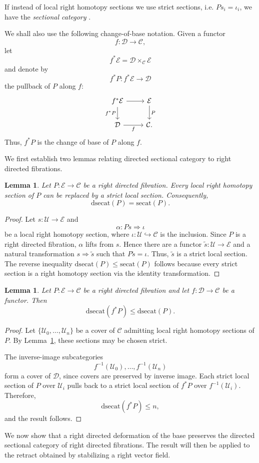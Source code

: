\documentclass[12pt]{amsart}
\newtheorem{lemma}[teo]{Lemma}
\theoremstyle{definition}
\theoremstyle{remark}
\numberwithin{figure}{section}%
\newcommand{\CC}{\mathcal{C}}
\newcommand{\Dc}{\mathcal{D}}
\newcommand{\E}{\mathcal{E}}
\newcommand{\Uc}{\mathcal{U}}
\begin{document}
If instead of local right homotopy sections we use strict sections, i.e. \(P s_i=\iota_i\), we have the \emph{sectional category} \cite{Baues-Isaac}.

We shall also use the following change-of-base notation. Given a functor
\[
f\colon\Dc\longrightarrow\CC,
\]
let
\[
f^*\E=\Dc\times_\CC\E
\]
and denote by
\[
f^*P\colon f^*\E\longrightarrow\Dc
\]
the pullback of \(P\) along \(f\):
\[
\begin{tikzcd}
f^*\E
  \arrow[r]
  \arrow[d, "f^*P"']
&
\E
  \arrow[d, "P"]
\\
\Dc
  \arrow[r, "f"']
&
\CC .
\end{tikzcd}
\]
Thus, \(f^*P\) is the change of base of \(P\) along \(f\).

We first establish two lemmas relating directed sectional category to right directed fibrations.

\begin{lemma}\label{lem:right_fibration_strictification}
Let \(P\colon\E\to\CC\) be a right directed fibration. Every local right
homotopy section of \(P\) can be replaced by a strict local section.
Consequently,
\[
\mathrm{dsecat}(P)=\mathrm{secat}(P).
\]
\end{lemma}

\begin{proof}
Let \(s\colon\Uc\to\E\) and
\[
\alpha\colon Ps\Rightarrow\iota
\]
be a local right homotopy section, where
\(\iota\colon\Uc\hookrightarrow\CC\) is the inclusion. Since \(P\) is a
right directed fibration, \(\alpha\) lifts from \(s\). Hence there are a
functor \(\widetilde s\colon\Uc\to\E\) and a natural transformation
\(
s\Rightarrow\widetilde s
\)
such that
\(
P\widetilde s=\iota.
\)
Thus, \(\widetilde s\) is a strict local section. The reverse inequality
\(\mathrm{dsecat}(P)\leq\mathrm{secat}(P)\) follows because every strict
section is a right homotopy section via the identity transformation.
\end{proof}
\begin{lemma}\label{lem:dsecat_pullback_monotonicity}
Let \(P\colon\E\to\CC\) be a right directed fibration and let
\(f\colon\Dc\to\CC\) be a functor. Then
\[
\mathrm{dsecat}(f^*P)
\leq
\mathrm{dsecat}(P).
\]
\end{lemma}

\begin{proof}
Let \(\{\Uc_0,\ldots,\Uc_n\}\) be a cover of \(\CC\) admitting local
right homotopy sections of \(P\). By
Lemma~\ref{lem:right_fibration_strictification}, these sections may be
chosen strict.

The inverse-image subcategories
\[
f^{-1}(\Uc_0),\ldots,f^{-1}(\Uc_n)
\]
form a cover of \(\Dc\), since covers are preserved by inverse image.
Each strict local section of \(P\) over \(\Uc_i\) pulls back to a strict
local section of \(f^*P\) over \(f^{-1}(\Uc_i)\). Therefore,
\[
\mathrm{dsecat}(f^*P)
\leq
n,
\]
and the result follows.
\end{proof}
We now show that a right directed deformation of the base preserves the
directed sectional category of right directed fibrations. The result will
then be applied to the retract obtained by stabilizing a right vector
field.
\end{document}
